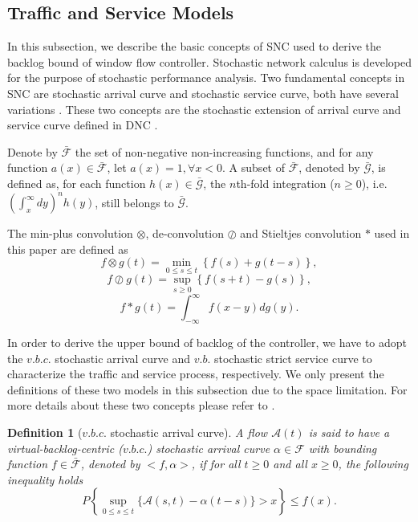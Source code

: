 \documentclass[paper]{ieice}
\newtheorem{definition}{Definition}
\begin{document}
\subsection{Traffic and Service Models}\label{trafficservice}
In this subsection, we describe the basic concepts of SNC used to derive the backlog bound of window flow controller. Stochastic network calculus is developed for the purpose of stochastic performance analysis. Two fundamental concepts in SNC are stochastic arrival curve and stochastic service curve, both have several variations \cite{JiangLiu-15877,jiang2006basic}.
These two concepts are the stochastic extension of arrival curve and service curve defined in DNC \cite{Boudec2001Network}.

Denote by $\bar{\mathcal{F}}$ the set of non-negative non-increasing functions, and for any function $a(x)\in\bar{\mathcal{F}}$, let $a(x)=1,\forall x<0$. A subset of $\bar{\mathcal{F}}$, denoted by $\bar{\mathcal{G}}$, is defined as, for each function $h(x)\in\bar{\mathcal{G}}$, the $n$th-fold integration ($n\geq 0$), i.e. $(\int_{x}^\infty dy)^nh(y)$, still belongs to $\bar{\mathcal{G}}$.

The min-plus convolution $\otimes$, de-convolution $\oslash$ and Stieltjes convolution $\ast$ used in this paper are defined as
$$f\otimes g(t)=\min_{0\leq s\leq t}\left\{f(s)+g(t-s)\right\},$$
$$f\oslash g(t)=\sup_{s\geq 0}\left\{f(s+t)-g(s)\right\},$$
$$f\ast g(t)=\int_{-\infty}^{\infty}f(x-y)dg(y).$$

In order to derive the upper bound of backlog of the controller, we have to adopt the $v.b.c.$ stochastic arrival curve \cite{jiang2006basic,JiangLiu-15877} and $v.b.$ stochastic strict service curve \cite{Wu2010Model} to characterize the traffic and service process, respectively. We only present the definitions of these two models in this subsection due to the space limitation. For more details about these two concepts please refer to \cite{JiangLiu-15877,Wu2010Model,jiang2006basic}.

\begin{definition}[$v.b.c.$ stochastic arrival curve]
A flow $\mathcal{A}(t)$ is said to have a virtual-backlog-centric ($v.b.c.$) stochastic arrival curve $\alpha\in\mathcal{F}$ with bounding function $f\in\bar{\mathcal{F}}$, denoted by $<f,\alpha>$, if for all $t\geq 0$ and all $x\geq 0$, the following inequality holds
$$P\left\{\sup_{0\leq s\leq t}\{\mathcal{A}(s,t)-\alpha(t-s)\}>x\right\}\leq f(x).$$
\end{definition}
\end{document}
